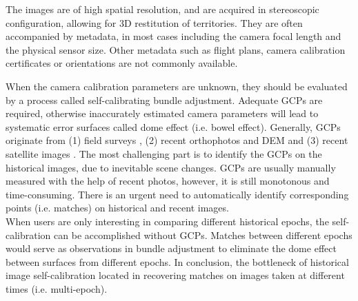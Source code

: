 The images are of high spatial resolution, and are acquired in stereoscopic configuration, allowing for 3D restitution of territories. 
They are often accompanied by metadata, in most cases including the camera focal length and the physical sensor size. Other metadata such as flight plans, camera calibration certificates or orientations are not commonly available. 
\par
When the camera calibration parameters are unknown, they should be evaluated by a process called self-calibrating bundle adjustment. Adequate \ac{GCP}s are required, otherwise inaccurately estimated camera parameters will lead to systematic error surfaces called dome effect (i.e. bowel effect).
Generally, \ac{GCP}s originate from (1) field surveys \cite{micheletti2015application,walstra2004time,cardenal2006use}, (2) recent orthophotos and DEM \cite{nurminen2015automation,ellis2006measuring,fox2008unlocking} and (3) recent satellite images \cite{ellis2006measuring,ford2013shoreline}. The most challenging part is to identify the \ac{GCP}s on the historical images, due to inevitable scene changes. \ac{GCP}s are usually manually measured with the help of recent photos, however, it is still monotonous and time-consuming. 
There is an urgent need to automatically identify corresponding points (i.e. matches) on historical and recent images.\\
When users are only interesting in comparing different historical epochs, the self-calibration can be accomplished without \ac{GCP}s. Matches between different epochs would serve as observations in bundle adjustment to eliminate the dome effect between surfaces from different epochs. In conclusion, the bottleneck of historical image self-calibration located in recovering matches on images taken at different times (i.e. multi-epoch).


